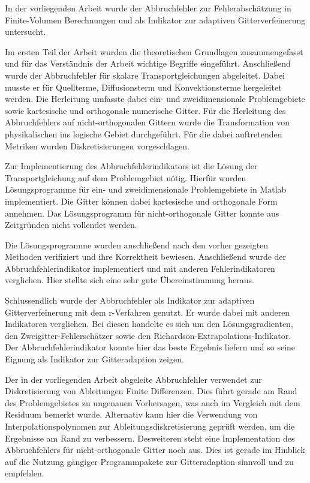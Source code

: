In der vorliegenden Arbeit wurde der Abbruchfehler zur Fehlerabschätzung
in Finite-Volumen Berechnungen und als Indikator zur
adaptiven Gitterverfeinerung untersucht.

Im ersten Teil der Arbeit wurden die theoretischen Grundlagen zusammengefasst
und für das Verständnis der Arbeit wichtige Begriffe eingeführt.
Anschließend wurde der Abbruchfehler für skalare Transportgleichungen abgeleitet.
Dabei musste er für Quellterme, Diffusionsterm und Konvektionsterme hergeleitet werden.
Die Herleitung umfasste dabei ein- und zweidimensionale Problemgebiete sowie kartesische und orthogonale
numerische Gitter. Für die Herleitung des Abbruchfehlers auf nicht-orthogonalen Gittern
wurde die Transformation von physikalischen ins logische Gebiet durchgeführt. Für die
dabei auftretenden Metriken wurden Diskretisierungen vorgeschlagen.


Zur Implementierung des Abbruchfehlerindikators ist die Lösung der Transportgleichung
auf dem Problemgebiet nötig. Hierfür wurden Lösungsprogramme für ein- und zweidimensionale
Problemgebiete in Matlab implementiert. Die Gitter können dabei kartesische und orthogonale
Form annehmen. Das Lösungsprogramm für nicht-orthogonale Gitter konnte aus Zeitgründen nicht vollendet werden.

Die Lösungsprogramme wurden anschließend nach den vorher gezeigten Methoden
verifiziert und ihre Korrektheit bewiesen.
Anschließend wurde der Abbruchfehlerindikator implementiert und mit anderen Fehlerindikatoren verglichen.
Hier stellte sich eine sehr gute Übereinstimmung heraus.

Schlussendlich
wurde der Abbruchfehler als Indikator zur adaptiven Gitterverfeinerung mit dem r-Verfahren genutzt.
Er wurde dabei mit anderen Indikatoren verglichen. Bei diesen handelte es sich um den
Lösungsgradienten, den Zweigitter-Fehlerschätzer sowie den Richardson-Extrapolations-Indikator.
Der Abbruchfehlerindikator konnte hier das beste Ergebnis liefern und so seine Eignung
als Indikator zur Gitteradaption zeigen.

Der in der vorliegenden Arbeit abgeleite Abbruchfehler verwendet zur Diskretisierung von Ableitungen
Finite Differenzen. Dies führt gerade am Rand des Problemgebietes zu ungenauen Vorhersagen, was
auch im Vergleich mit dem Residuum bemerkt wurde.
Alternativ kann hier die Verwendung von Interpolationspolynomen 
zur Ableitungsdiskretisierung geprüft werden, um die Ergebnisse am Rand zu verbessern.
Desweiteren steht eine Implementation des Abbruchfehlers für nicht-orthogonale Gitter
noch aus. Dies ist gerade im Hinblick auf die Nutzung gängiger Programmpakete zur Gitteradaption
sinnvoll und zu empfehlen.
